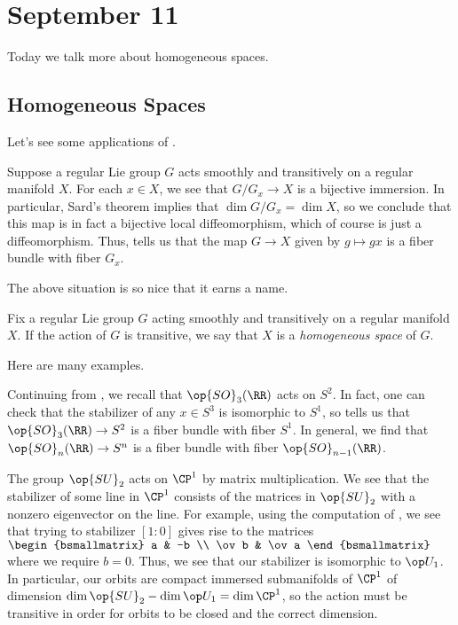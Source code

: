 \documentclass[../notes.tex]{subfiles}
\begin{document}
\section{September 11}
Today we talk more about homogeneous spaces.

\subsection{Homogeneous Spaces}
Let's see some applications of .
\begin{example} \label{ex:transitive-group-action}
	Suppose a regular Lie group $G$ acts smoothly and transitively on a regular manifold $X$. For each $x\in X$, we see that $G/G_x\to X$ is a bijective immersion. In particular, Sard's theorem implies that $\dim G/G_x=\dim X$, so we conclude that this map is in fact a bijective local diffeomorphism, which of course is just a diffeomorphism. Thus,  tells us that the map $G\to X$ given by $g\mapsto gx$ is a fiber bundle with fiber $G_x$.
\end{example}
The above situation is so nice that it earns a name.
\begin{definition}
	Fix a regular Lie group $G$ acting smoothly and transitively on a regular manifold $X$. If the action of $G$ is transitive, we say that $X$ is a \textit{homogeneous space} of $G$.
\end{definition}
Here are many examples.
\begin{example}
	Continuing from , we recall that $\op{SO}_3(\RR)$ acts on $S^2$. In fact, one can check that the stabilizer of any $x\in S^3$ is isomorphic to $S^1$, so  tells us that $\op{SO}_3(\RR)\to S^2$ is a fiber bundle with fiber $S^1$. In general, we find that $\op{SO}_n(\RR)\to S^n$ is a fiber bundle with fiber $\op{SO}_{n-1}(\RR)$.%
\end{example}
\begin{example}
	The group $\op{SU}_2$ acts on $\CP^1$ by matrix multiplication. We see that the stabilizer of some line in $\CP^1$ consists of the matrices in $\op{SU}_2$ with a nonzero eigenvector on the line. For example, using the computation of , we see that trying to stabilizer $[1:0]$ gives rise to the matrices $\begin{bsmallmatrix}
		a & -b \\
		\ov b & \ov a
	\end{bsmallmatrix}$ where we require $b=0$. Thus, we see that our stabilizer is isomorphic to $\op U_1$. In particular, our orbits are compact immersed submanifolds of $\CP^1$ of dimension $\dim{\op{SU}_2}-\dim{\op U_1}=\dim\CP^1$, so the action must be transitive in order for orbits to be closed and the correct dimension.
\end{example}
\end{document}
